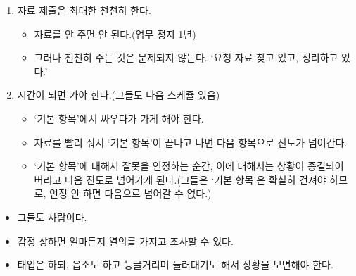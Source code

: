 \begin{enumerate}[①]\tightlist
\item 자료 제출은 최대한 천천히 한다. 
	\begin{itemize}\tightlist
	\item 자료를 안 주면 안 된다.(업무 정지 1년)
	\item 그러나 천천히 주는 것은 문제되지 않는다.  ‘요청 자료 찾고 있고, 정리하고 있다.’
	\end{itemize}
\item 시간이 되면 가야 한다.(그들도 다음 스케쥴 있음)
	\begin{itemize}\tightlist
	\item ‘기본 항목’에서 싸우다가 가게 해야 한다.
	\item 자료를 빨리 줘서 ‘기본 항목’이 끝나고 나면 다음 항목으로 진도가 넘어간다.
	\item ‘기본 항목’에 대해서 잘못을 인정하는 순간, 이에 대해서는 상황이 종결되어 버리고 다음 진도로 넘어가게 된다.(그들은 ‘기본 항목’은 확실히 건져야 하므로, 인정 안 하면 다음으로 넘어갈 수 없다.)
	\end{itemize}
\end{enumerate} 
\begin{itemize}\tightlist
\item 그들도 사람이다.
\item 감정 상하면 얼마든지 열의를 가지고 조사할 수 있다.
\item 태업은 하되, 읍소도 하고 능글거리며 둘러대기도 해서 상황을 모면해야 한다. 
\end{itemize}

